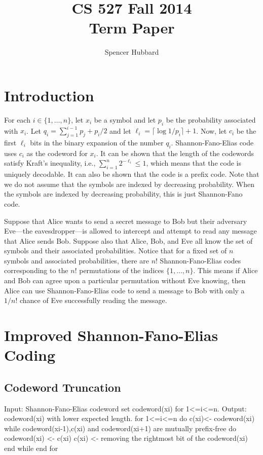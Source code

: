 \documentclass[10pt,letterpaper,notitlepage,draft]{article}
\title{CS 527 Fall 2014\\Term Paper}
\author{Spencer Hubbard} %
\date{} %
\theoremstyle{definition}
\begin{document}
\maketitle


\section{Introduction}
For each $i \in \lbrace 1, \ldots, n\rbrace$, let $x_i$ be a symbol and let $p_i$ be the probability associated with $x_i$. Let $q_i = \sum_{j=1}^{i-1} p_j + p_i / 2$ and let $\ell_i = \lceil\log 1 / p_i \rceil + 1$. Now, let $c_i$ be the first $\ell_i$ bits in the binary expansion of the number $q_i$. Shannon-Fano-Elias code uses $c_i$ as the codeword for $x_i$. It can be shown that the length of the codewords satisfy Kraft's inequality, i.e., $\sum_{i = 1}^n 2^{-\ell_i} \le 1$, which means that the code is uniquely decodable. It can also be shown that the code is a prefix code. Note that we do not assume that the symbols are indexed by decreasing probability. When the symbols are indexed by decreasing probability, this is just Shannon-Fano code.

Suppose that Alice wants to send a secret message to Bob but their adversary Eve---the eavesdropper---is allowed to intercept and attempt to read any message that Alice sends Bob. Suppose also that Alice, Bob, and Eve all know the set of symbols and their associated probabilities. Notice that for a fixed set of $n$ symbols and associated probabilities, there are $n!$ Shannon-Fano-Elias codes corresponding to the $n!$ permutations of the indices $\lbrace 1, \dots, n\rbrace$. This means if Alice and Bob can agree upon a particular permutation without Eve knowing, then Alice can use Shannon-Fano-Elias code to send a message to Bob with only a $1/n!$ chance of Eve successfully reading the message.

\section{Improved Shannon-Fano-Elias Coding}

\subsection{Codeword Truncation}
Input: Shannon-Fano-Elias codeword set codeword(xi) for 1<=i<=n.
Output: codeword(xi) with lower expected length.
	for 1<=i<=n do
		c(xi)<- codeword(xi)
		while codeword(xi-1),c(xi) and codeword(xi+1) are mutually prefix-free do
			codeword(xi) <- c(xi)
			c(xi) <- removing the rightmost bit of the codeword(xi)
		end while
	end for
\end{document}
